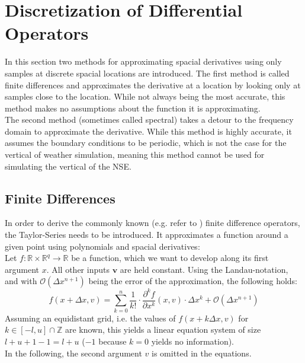 \section{Discretization of Differential Operators}\label{section:diff_op}
In this section two methods for approximating spacial derivatives using only samples at discrete spacial locations are introduced.
The first method is called finite differences and approximates the derivative at a location by looking only at samples close to the location.
While not always being the most accurate, this method makes no assumptions about the function it is approximating.\\
The second method (sometimes called spectral) takes a detour to the frequency domain to approximate the derivative.
While this method is highly accurate, it assumes the boundary conditions to be periodic, which is not the case for the vertical of weather simulation, meaning this method cannot be used for simulating the vertical of the NSE.

\subsection{Finite Differences}
In order to derive the commonly known (e.g. refer to \cite{smith1985numerical}) finite difference operators, the Taylor-Series needs to be introduced.
It approximates a function around a given point using polynomials and spacial derivatives:\\
Let $f:\mathbb{R}\times\mathbb{R}^q\rightarrow \mathbb{R}$ be a function, which we want to develop along its first argument $x$.
All other inputs $\boldsymbol{v}$ are held constant.
Using the Landau-notation, and with $\mathcal{O}(\Delta x ^{n+1})$ being the error of the approximation, the following holds:
\begin{equation}
f(x+\Delta x,v) = \sum_{k=0}^{n}\frac{1}{k!}\cdot\frac{\partial^k f}{\partial x ^k}(x,v)\cdot \Delta x^k + \mathcal{O}(\Delta x ^{n+1})
\end{equation}
Assuming an equidistant grid, i.e. the values of $f(x+k\Delta x,v)$ for $k\in [-l,u] \cap \mathbb{Z}$ are known, this yields a linear equation system of size $l + u + 1 - 1= l + u$ ($-1$ because $k=0$ yields no information).\\
In the following, the second argument $v$ is omitted in the equations.

